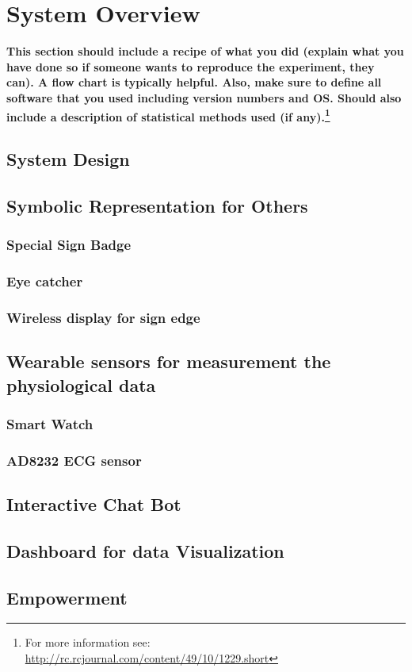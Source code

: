 \chapter{System Overview}

\textbf{This section should include a recipe of what you did (explain what you have done so if someone wants to reproduce the experiment, they can).  A flow chart is typically helpful.  Also, make sure to define all software that you used including version numbers and OS.  Should also include a description of statistical methods used (if any).\footnote{For more information see: \url{http://rc.rcjournal.com/content/49/10/1229.short}}}

\Blindtext
\section{System Design}
\section{Symbolic Representation for Others}
\subsection{Special Sign Badge}
\subsection{Eye catcher}
\subsection{Wireless display for sign edge}
\section{Wearable sensors for measurement the physiological data}
\subsection{Smart Watch}
\subsection{AD8232 ECG sensor}
\section{Interactive Chat Bot}
\subsection{}
\section{Dashboard for data Visualization }
\section{Empowerment}
\blindtext